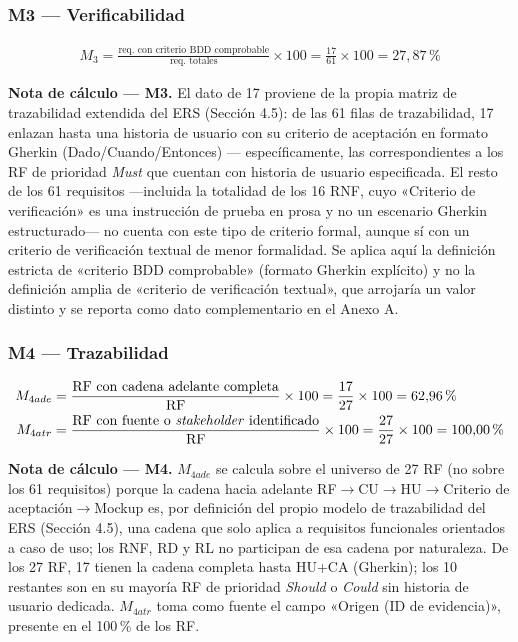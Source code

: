 \documentclass[11pt]{article}
\begin{document}
	\subsubsection*{M3 --- Verificabilidad}
	
	{\setlength{\jot}{8pt}
		\begin{align*}
			M_3 = \frac{\text{req. con criterio BDD comprobable}}{\text{req. totales}} \times 100 = \frac{17}{61} \times 100 = 27{,}87\,\%
	\end{align*}}
	
	\textbf{Nota de cálculo --- M3.} El dato de 17 proviene de la propia matriz de trazabilidad extendida del ERS (Sección 4.5): de las 61 filas de trazabilidad, 17 enlazan hasta una historia de usuario con su criterio de aceptación en formato Gherkin (Dado/Cuando/Entonces) --- específicamente, las correspondientes a los RF de prioridad \emph{Must} que cuentan con historia de usuario especificada. El resto de los 61 requisitos ---incluida la totalidad de los 16 RNF, cuyo «Criterio de verificación» es una instrucción de prueba en prosa y no un escenario Gherkin estructurado--- no cuenta con este tipo de criterio formal, aunque sí con un criterio de verificación textual de menor formalidad. Se aplica aquí la definición estricta de «criterio BDD comprobable» (formato Gherkin explícito) y no la definición amplia de «criterio de verificación textual», que arrojaría un valor distinto y se reporta como dato complementario en el Anexo A.
	
	\subsubsection*{M4 --- Trazabilidad}
	
	{\setlength{\jot}{8pt}
		\begin{align*}
			M_{4ade} &= \frac{\text{RF con cadena adelante completa}}{\text{RF}} \times 100 = \frac{17}{27} \times 100 = 62{,}96\,\% \\
			M_{4atr} &= \frac{\text{RF con fuente o \textit{stakeholder} identificado}}{\text{RF}} \times 100 = \frac{27}{27} \times 100 = 100{,}00\,\%
	\end{align*}}
	
	\textbf{Nota de cálculo --- M4.} $M_{4ade}$ se calcula sobre el universo de 27 RF (no sobre los 61 requisitos) porque la cadena hacia adelante RF$\rightarrow$CU$\rightarrow$HU$\rightarrow$Criterio de aceptación$\rightarrow$Mockup es, por definición del propio modelo de trazabilidad del ERS (Sección 4.5), una cadena que solo aplica a requisitos funcionales orientados a caso de uso; los RNF, RD y RL no participan de esa cadena por naturaleza. De los 27 RF, 17 tienen la cadena completa hasta HU+CA (Gherkin); los 10 restantes son en su mayoría RF de prioridad \emph{Should} o \emph{Could} sin historia de usuario dedicada. $M_{4atr}$ toma como fuente el campo «Origen (ID de evidencia)», presente en el 100\,\% de los RF.
	
\end{document}
